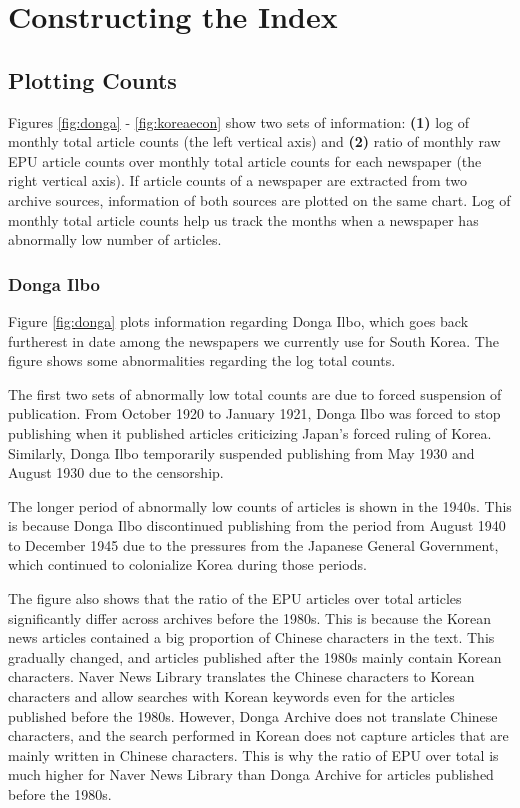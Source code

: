 \section{Constructing the Index}
\subsection{Plotting Counts}

Figures \ref{fig:donga} - \ref{fig:koreaecon} show two sets of information: \textbf{(1)} log of monthly total article counts (the left vertical axis) and \textbf{(2)} ratio of monthly raw EPU article counts over monthly total article counts for each newspaper (the right vertical axis). If article counts of a newspaper are extracted from two archive sources, information of both sources are plotted on the same chart. Log of monthly total article counts help us track the months when a newspaper has abnormally low number of articles. 

\subsubsection{Donga Ilbo}

Figure \ref{fig:donga} plots information regarding Donga Ilbo, which goes back furtherest in date among the newspapers we currently use for South Korea. The figure shows some abnormalities regarding the log total counts.

The first two sets of abnormally low total counts are due to forced suspension of publication. From October 1920 to January 1921, Donga Ilbo was forced to stop publishing when it published articles criticizing Japan's forced ruling of Korea. Similarly, Donga Ilbo temporarily suspended publishing from May 1930 and August 1930 due to the censorship. 

The longer period of abnormally low counts of articles is shown in the 1940s. This is because Donga Ilbo discontinued publishing from the period from August 1940 to December 1945 due to the pressures from the Japanese General Government, which continued to colonialize Korea during those periods. 

The figure also shows that the ratio of the EPU articles over total articles significantly differ across archives before the 1980s. This is because the Korean news articles contained a big proportion of Chinese characters in the text. This gradually changed, and articles published after the 1980s mainly contain Korean characters. Naver News Library translates the Chinese characters to Korean characters and allow searches with Korean keywords even for the articles published before the 1980s. However, Donga Archive does not translate Chinese characters, and the search performed in Korean does not capture articles that are mainly written in Chinese characters. This is why the ratio of EPU over total is much higher for Naver News Library than Donga Archive for articles published before the 1980s.  

